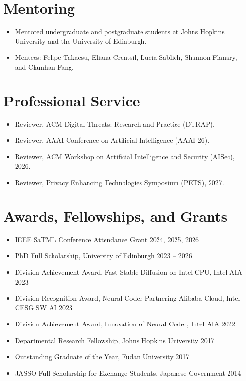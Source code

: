 \documentclass[10pt,a4paper]{article}
\begin{document}
\section*{Mentoring}
\begin{itemize}
    \item Mentored undergraduate and postgraduate students at Johns Hopkins University and the University of Edinburgh.
    \item Mentees: Felipe Takaesu, Eliana Crentsil, Lucia Sablich, Shannon Flanary, and Chunhan Fang.
\end{itemize}

\section*{Professional Service}
\begin{itemize}
    \item Reviewer, ACM Digital Threats: Research and Practice (DTRAP).
    \item Reviewer, AAAI Conference on Artificial Intelligence (AAAI-26).
    \item Reviewer, ACM Workshop on Artificial Intelligence and Security (AISec), 2026.
    \item Reviewer, Privacy Enhancing Technologies Symposium (PETS), 2027.
\end{itemize}

\section*{Awards, Fellowships, and Grants}
\begin{itemize}
    \item IEEE SaTML Conference Attendance Grant \hfill 2024, 2025, 2026
    \item PhD Full Scholarship, University of Edinburgh \hfill 2023 -- 2026
    \item Division Achievement Award, Fast Stable Diffusion on Intel CPU, Intel AIA \hfill 2023
    \item Division Recognition Award, Neural Coder Partnering Alibaba Cloud, Intel CESG SW AI \hfill 2023
    \item Division Achievement Award, Innovation of Neural Coder, Intel AIA \hfill 2022
    \item Departmental Research Fellowship, Johns Hopkins University \hfill 2017
    \item Outstanding Graduate of the Year, Fudan University \hfill 2017
    \item JASSO Full Scholarship for Exchange Students, Japanese Government \hfill 2014
\end{itemize}
\end{document}
